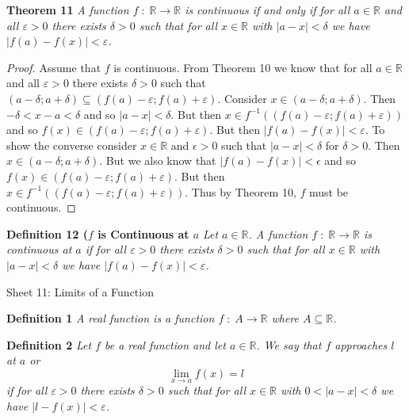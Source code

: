 \documentclass{article}
\begin{document}
\begin{flushleft}
\textbf{Theorem 11}
\textsl{A function $f \; : \; \mathbb{R} \rightarrow \mathbb{R}$ is continuous if and only if for all $a \in \mathbb{R}$ and all $\varepsilon > 0$ there exists $\delta > 0$ such that for all $x \in \mathbb{R}$ with $|a-x| < \delta$ we have $|f(a)-f(x)| < \varepsilon$.}
\begin{proof}
Assume that $f$ is continuous. From Theorem 10 we know that for all $a \in \mathbb{R}$ and all $\varepsilon > 0$ there exists $\delta > 0$ such that $(a - \delta ; a + \delta) \subseteq (f(a) - \varepsilon ; f(a) + \varepsilon)$. Consider $x \in (a - \delta ; a + \delta)$. Then $- \delta < x-a < \delta$ and so $|a-x| < \delta$. But then $x \in f^{-1}((f(a) - \varepsilon ; f(a) + \varepsilon))$ and so $f(x) \in (f(a) - \varepsilon ; f(a) + \varepsilon)$. But then $|f(a) - f(x)| < \varepsilon$. To show the converse consider $x \in \mathbb{R}$ and $\epsilon > 0$ such that $|a-x| < \delta$ for $\delta > 0$. Then $x \in (a - \delta ; a + \delta)$. But we also know that $|f(a) - f(x)| < \epsilon$ and so $f(x) \in (f(a) - \varepsilon ; f(a) + \varepsilon)$. But then $x \in f^{-1}((f(a) - \varepsilon ; f(a) + \varepsilon))$. Thus by Theorem 10, $f$ must be continuous.
\end{proof}

\textbf{Definition 12 ($f$ is Continuous at $a$}
\textsl{Let $a \in \mathbb{R}$. A function $f \; : \; \mathbb{R} \rightarrow \mathbb{R}$ is continuous at $a$ if for all $\varepsilon > 0$ there exists $\delta > 0$ such that for all $x \in \mathbb{R}$ with $|a-x| < \delta$ we have $|f(a)-f(x)| < \varepsilon$.}

\newpage

\Large

Sheet 11: Limits of a Function\newline

\normalsize

\textbf{Definition 1}
\textsl{A real function is a function $f \; : \; A \rightarrow \mathbb{R}$ where $A \subseteq \mathbb{R}$.}\newline

\textbf{Definition 2}
\textsl{Let $f$ be a real function and let $a \in \mathbb{R}$. We say that $f$ approaches $l$ at $a$ or
\[
\lim_{x \rightarrow a} f(x) = l
\]
if for all $\varepsilon > 0$ there exists $\delta > 0$ such that for all $x \in \mathbb{R}$ with $0 < |a-x| < \delta$ we have $|l - f(x)| < \varepsilon$.}\newline


\end{flushleft}
\end{document}
